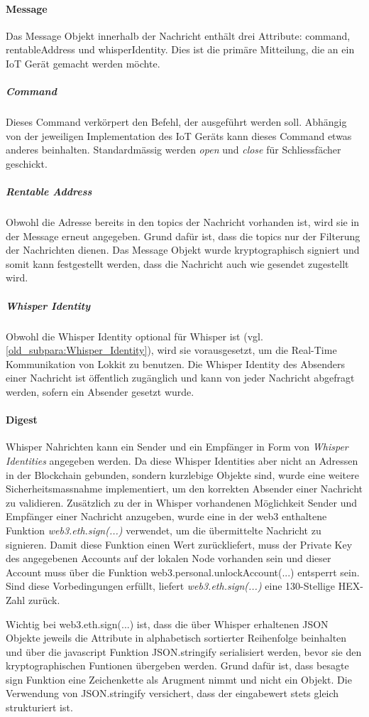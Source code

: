 \paragraph{Message}
Das Message Objekt innerhalb der Nachricht enthält drei Attribute: command, rentableAddress und whisperIdentity. Dies ist die primäre Mitteilung, die an ein IoT Gerät gemacht werden möchte.
\subparagraph{Command}
Dieses Command verkörpert den Befehl, der ausgeführt werden soll. Abhängig von der jeweiligen Implementation des IoT Geräts kann dieses Command etwas anderes beinhalten. Standardmässig werden \emph{open} und \emph{close} für Schliessfächer geschickt.
\subparagraph{Rentable Address}
Obwohl die Adresse bereits in den topics der Nachricht vorhanden ist, wird sie in der Message erneut angegeben. Grund dafür ist, dass die topics nur der Filterung der Nachrichten dienen. Das Message Objekt wurde kryptographisch signiert und somit kann festgestellt werden, dass die Nachricht auch wie gesendet zugestellt wird.
\subparagraph{Whisper Identity}
Obwohl die Whisper Identity optional für Whisper ist (vgl. \ref{old_subpara:Whisper_Identity}), wird sie vorausgesetzt, um die Real-Time Kommunikation von Lokkit zu benutzen. Die Whisper Identity des Absenders einer Nachricht ist öffentlich zugänglich und kann von jeder Nachricht abgefragt werden, sofern ein Absender gesetzt wurde.

\paragraph{Digest}
Whisper Nahrichten kann ein Sender und ein Empfänger in Form von \emph{Whisper Identities} angegeben werden. Da diese Whisper Identities aber nicht an Adressen in der Blockchain gebunden, sondern kurzlebige Objekte sind, wurde eine weitere Sicherheitsmassnahme implementiert, um den korrekten Absender einer Nachricht zu validieren.
Zusätzlich zu der in Whisper vorhandenen Möglichkeit Sender und Empfänger einer Nachricht anzugeben, wurde eine in der web3 enthaltene Funktion \emph{web3.eth.sign(...)} verwendet, um die übermittelte Nachricht zu signieren. Damit diese Funktion einen Wert zurückliefert, muss der Private Key des angegebenen Accounts auf der lokalen Node vorhanden sein und dieser Account muss über die Funktion web3.personal.unlockAccount(...) entsperrt sein. Sind diese Vorbedingungen erfüllt, liefert \emph{web3.eth.sign(...)} eine 130-Stellige HEX-Zahl zurück.

Wichtig bei web3.eth.sign(...) ist, dass die über Whisper erhaltenen JSON Objekte jeweils die Attribute in alphabetisch sortierter Reihenfolge beinhalten und über die javascript Funktion JSON.stringify serialisiert werden, bevor sie den kryptographischen Funtionen übergeben werden. Grund dafür ist, dass besagte sign Funktion eine Zeichenkette als Arugment nimmt und nicht ein Objekt. Die Verwendung von JSON.stringify versichert, dass der eingabewert stets gleich strukturiert ist.

